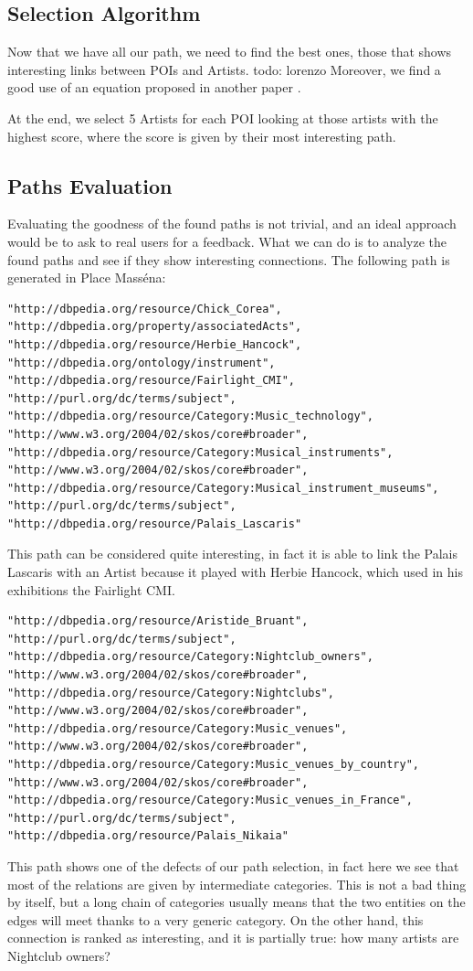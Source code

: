 \documentclass[paper=a4, fontsize=11pt]{scrartcl}
\begin{document}
\subsection{Selection Algorithm}
Now that we have all our path, we need to find the best ones, those that shows interesting links between POIs and Artists.
todo: lorenzo
Moreover, we find a good use of an equation proposed in another paper \cite{meng2013review}.

At the end, we select 5 Artists for each POI looking at those artists with the highest score, where the score is given by their most interesting path.

\subsection{Paths Evaluation}
Evaluating the goodness of the found paths is not trivial, and an ideal approach would be to ask to real users for a feedback.
What we can do is to analyze the found paths and see if they show interesting connections.
The following path is generated in Place Masséna:
\begin{lstlisting}
"http://dbpedia.org/resource/Chick_Corea", 
"http://dbpedia.org/property/associatedActs", 
"http://dbpedia.org/resource/Herbie_Hancock", 
"http://dbpedia.org/ontology/instrument", 
"http://dbpedia.org/resource/Fairlight_CMI", 
"http://purl.org/dc/terms/subject", 
"http://dbpedia.org/resource/Category:Music_technology", 
"http://www.w3.org/2004/02/skos/core#broader", 
"http://dbpedia.org/resource/Category:Musical_instruments", 
"http://www.w3.org/2004/02/skos/core#broader",       
"http://dbpedia.org/resource/Category:Musical_instrument_museums", 
"http://purl.org/dc/terms/subject", 
"http://dbpedia.org/resource/Palais_Lascaris"
\end{lstlisting}
This path can be considered quite interesting, in fact it is able to link the Palais Lascaris with an Artist because it played with Herbie Hancock, which used in his exhibitions the Fairlight CMI.
\begin{lstlisting}
"http://dbpedia.org/resource/Aristide_Bruant", 
"http://purl.org/dc/terms/subject", 
"http://dbpedia.org/resource/Category:Nightclub_owners", 
"http://www.w3.org/2004/02/skos/core#broader", 
"http://dbpedia.org/resource/Category:Nightclubs", 
"http://www.w3.org/2004/02/skos/core#broader", 
"http://dbpedia.org/resource/Category:Music_venues", 
"http://www.w3.org/2004/02/skos/core#broader", 
"http://dbpedia.org/resource/Category:Music_venues_by_country", 
"http://www.w3.org/2004/02/skos/core#broader", 
"http://dbpedia.org/resource/Category:Music_venues_in_France", 
"http://purl.org/dc/terms/subject", 
"http://dbpedia.org/resource/Palais_Nikaia"
\end{lstlisting}
This path shows one of the defects of our path selection, in fact here we see that most of the relations are given by intermediate categories. This is not a bad thing by itself, but a long chain of categories usually means that the two entities on the edges will meet thanks to a very generic category. On the other hand, this connection is ranked as interesting, and it is partially true: how many artists are Nightclub owners?
\end{document}
